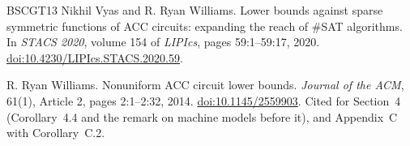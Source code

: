 \documentclass[11pt,letterpaper]{article}
\theoremstyle{definition}
\theoremstyle{remark}
\begin{document}
\begin{thebibliography}{BSCGT13}
Nikhil Vyas and R. Ryan Williams.
\newblock Lower bounds against sparse symmetric functions of ACC circuits: expanding the reach of \#SAT algorithms.
\newblock In \emph{STACS 2020}, volume 154 of \emph{LIPIcs}, pages 59:1--59:17, 2020.
\newblock \href{https://doi.org/10.4230/LIPIcs.STACS.2020.59}{doi:10.4230/LIPIcs.STACS.2020.59}.

R. Ryan Williams.
\newblock Nonuniform ACC circuit lower bounds.
\newblock \emph{Journal of the ACM}, 61(1), Article 2, pages 2:1--2:32, 2014.
\newblock \href{https://doi.org/10.1145/2559903}{doi:10.1145/2559903}.
Cited for Section~4 (Corollary~4.4 and the remark on machine models
before it), and Appendix~C with Corollary~C.2.
\end{thebibliography}
\end{document}
